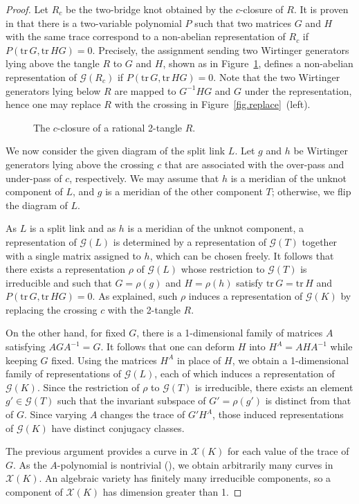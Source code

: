 \documentclass[12pt,reqno]{amsart}
\theoremstyle{definition}
\def\calG{\mathcal G}
\def\calX{\mathcal X}
\def\tr{\mathrm{tr}\,}
\begin{document}
\begin{proof}
Let $R_c$ be the two-bridge knot obtained by the $c$-closure of $R$. It is proven in \cite{Riley1984} that there is a two-variable polynomial $P$ such that two matrices $G$ and $H$ with the same trace correspond to a non-abelian representation of $R_c$ if  $P(\tr G, \tr HG)=0$. Precisely, the assignment sending two Wirtinger generators lying above the tangle $R$ to $G$ and $H$, shown as in Figure~\ref{fig.closure}, defines a non-abelian representation of $\calG(R_c)$ if $P(\tr G,\tr HG)=0$. Note that the two Wirtinger generators lying below $R$ are mapped to $G^{-1}HG$ and $G$ under the representation, hence one may replace $R$ with the crossing in Figure~\ref{fig.replace}~(left).

\begin{figure}[!h]
    \centering
    
    \caption{The $c$-closure of a rational 2-tangle $R$.}
    \label{fig.closure}
\end{figure}

We now consider the given diagram of the split link $L$.
Let $g$ and $h$ be Wirtinger generators lying above the crossing $c$ that are associated with the over-pass and under-pass of $c$, respectively. We may assume that $h$ is a meridian of the unknot component of $L$, and $g$ is a meridian of the other component $T$; otherwise, we flip the diagram of $L$.

As $L$ is a split link and as $h$ is a meridian of the unknot component, a representation of $\calG(L)$ is determined by a representation of $\calG(T)$ together with a single matrix assigned to $h$, which can be chosen freely. It follows that there exists a representation $\rho$ of $\calG(L)$ whose restriction to $\calG(T)$ is irreducible and such that $G=\rho(g)$ and $H=\rho(h)$ satisfy $\tr G = \tr H$ and $P(\tr G, \tr HG)=0$.
As explained, such $\rho$ induces a representation of $\calG(K)$ by replacing the crossing $c$ with the 2-tangle $R$.

On the other hand, for fixed $G$, there is a 1-dimensional family of matrices $A$ satisfying $AGA^{-1}=G$. It follows that one can deform $H$ into $H^A=AHA^{-1}$ while keeping $G$ fixed. Using the matrices $H^A$ in place of $H$, we obtain a 1-dimensional family of representations of $\calG(L)$, each of which induces a representation of $\calG(K)$.
Since the restriction of $\rho$ to $\calG(T)$ is irreducible, there exists an element $g' \in \calG(T)$ such that the invariant subspace of $G'=\rho(g')$ is distinct from that of $G$. 
Since varying $A$ changes the trace of $G'H^A$, those induced representations of $\calG(K)$ have distinct conjugacy classes. 

The previous argument provides a curve in $\calX(K)$ for each value of the trace of $G$. As the $A$-polynomial is nontrivial  
(\cite{dunfield2004non, boden2014nontriviality, boyerzhang}),
we obtain arbitrarily many curves in $\calX(K)$.  
An algebraic variety has finitely many irreducible components, 
so  
a component of $\calX(K)$  has dimension greater than 1. 
\end{proof}
\end{document}
